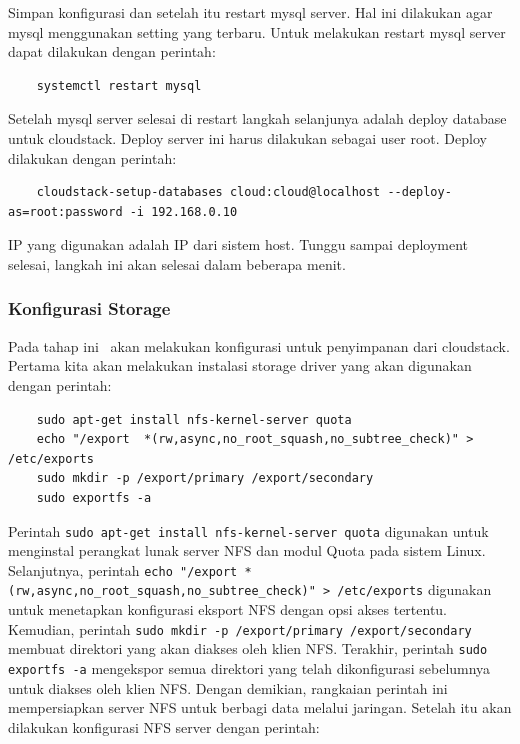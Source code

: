 Simpan konfigurasi dan setelah itu restart mysql server. Hal ini dilakukan agar mysql menggunakan setting yang terbaru. Untuk melakukan restart mysql server dapat dilakukan dengan perintah:

\begin{lstlisting}
    systemctl restart mysql
\end{lstlisting}

Setelah mysql server selesai di restart langkah selanjunya adalah deploy database untuk cloudstack. Deploy server ini harus dilakukan sebagai user root. Deploy dilakukan dengan perintah:

\begin{lstlisting}
    cloudstack-setup-databases cloud:cloud@localhost --deploy-as=root:password -i 192.168.0.10
\end{lstlisting}

IP yang digunakan adalah IP dari sistem host. Tunggu sampai deployment selesai, langkah ini akan selesai dalam beberapa menit.

\subsubsection{Konfigurasi Storage}
Pada tahap ini \saya\ akan melakukan konfigurasi untuk penyimpanan dari cloudstack. Pertama kita akan melakukan instalasi storage driver yang akan digunakan dengan perintah:

\begin{lstlisting}
    sudo apt-get install nfs-kernel-server quota
    echo "/export  *(rw,async,no_root_squash,no_subtree_check)" > /etc/exports
    sudo mkdir -p /export/primary /export/secondary
    sudo exportfs -a
\end{lstlisting}

Perintah \texttt{sudo apt-get install nfs-kernel-server quota} digunakan untuk menginstal perangkat lunak server NFS dan modul Quota pada sistem Linux. Selanjutnya, perintah \texttt{echo "/export *(rw,async,no\_root\_squash,no\_subtree\_check)" > /etc/exports} digunakan untuk menetapkan konfigurasi eksport NFS dengan opsi akses tertentu. Kemudian, perintah \texttt{sudo mkdir -p /export/primary /export/secondary} membuat direktori yang akan diakses oleh klien NFS. Terakhir, perintah \texttt{sudo exportfs -a} mengekspor semua direktori yang telah dikonfigurasi sebelumnya untuk diakses oleh klien NFS. Dengan demikian, rangkaian perintah ini mempersiapkan server NFS untuk berbagi data melalui jaringan. Setelah itu akan dilakukan konfigurasi NFS server dengan perintah:

